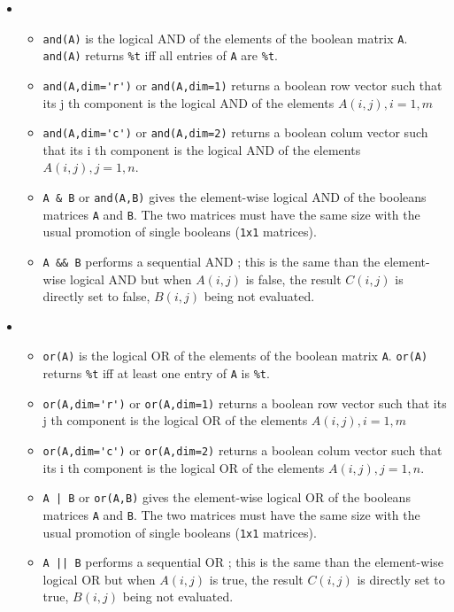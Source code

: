 \begin{mandescription}
  \begin{itemize} 
  \item {}
  \begin{itemize} 
  \item \verb!and(A)! is the logical AND of the elements of the boolean matrix \verb!A!. 
    \verb!and(A)! returns \verb!%t! iff all entries of \verb!A! are \verb!%t!. 
  \item \verb!and(A,dim='r')! or \verb!and(A,dim=1)!
    returns a boolean row vector such that its j th component is the logical AND of the 
    elements $A(i,j),i=1,m$
  \item \verb!and(A,dim='c')! or \verb!and(A,dim=2)! returns a boolean colum vector 
    such that its i th component is the logical AND of the elements $A(i,j),j=1,n$.
  \item \verb!A & B! or \verb!and(A,B)! gives the element-wise logical AND
    of the booleans matrices \verb!A! and  \verb!B!. The two matrices must have the same size 
    with the usual promotion of single booleans (\verb!1x1! matrices). 
  \item \verb!A && B! performs a sequential AND ; this is the same than 
    the element-wise logical AND but when $A(i,j)$ is false, the result $C(i,j)$
    is directly set to false, $B(i,j)$ being not evaluated.
  \end{itemize}
  \item {}
  \begin{itemize} 
  \item \verb!or(A)! is the logical OR of the elements of the boolean matrix \verb!A!. 
    \verb!or(A)! returns \verb!%t! iff at least one entry of \verb!A! is \verb!%t!. 
  \item \verb!or(A,dim='r')! or \verb!or(A,dim=1)!
    returns a boolean row vector such that its j th component is the logical OR of the 
    elements $A(i,j),i=1,m$
  \item \verb!or(A,dim='c')! or \verb!or(A,dim=2)! returns a boolean colum vector 
    such that its i th component is the logical OR of the elements $A(i,j),j=1,n$.
  \item \verb!A | B! or \verb!or(A,B)! gives the element-wise logical  OR
    of the booleans matrices \verb!A! and  \verb!B!. The two matrices must have the same size 
    with the usual promotion of single booleans (\verb!1x1! matrices). 
  \item \verb!A || B! performs a sequential OR ; this is the same than 
    the element-wise logical OR but when $A(i,j)$ is true, the result $C(i,j)$
    is directly set to true, $B(i,j)$ being not evaluated.
  \end{itemize} 
\end{itemize}

\end{mandescription}

